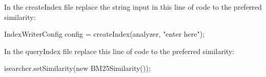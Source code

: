 \noindent In the createIndex file replace the string input in this line of code to the preferred similarity:
	
\begin{center} 
	IndexWriterConfig config =  createIndex(analyzer, "enter here"); \newline
\end{center}

\noindent In the queryIndex file replace this line of code to the preferred similarity: 

\begin{center} 
	isearcher.setSimilarity(new BM25Similarity()); \newline
\end{center}

